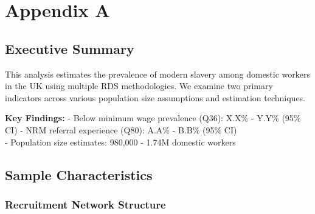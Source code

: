 \documentclass[
  12pt,
  letterpaper,
  DIV=11,
  numbers=noendperiod]{scrartcl}
\begin{document}
\printbibliography[heading=none]

\newpage

\appendix

\section{Appendix A}\label{appendix-a}

\subsection{Executive Summary}\label{executive-summary}

This analysis estimates the prevalence of modern slavery among domestic
workers in the UK using multiple RDS methodologies. We examine two
primary indicators across various population size assumptions and
estimation techniques.

\textbf{Key Findings:} - Below minimum wage prevalence (Q36): X.X\% -
Y.Y\% (95\% CI) - NRM referral experience (Q80): A.A\% - B.B\% (95\%
CI)\\
- Population size estimates: 980,000 - 1.74M domestic workers

\subsection{Sample Characteristics}\label{sample-characteristics}

\subsubsection{Recruitment Network
Structure}\label{recruitment-network-structure}
\end{document}
